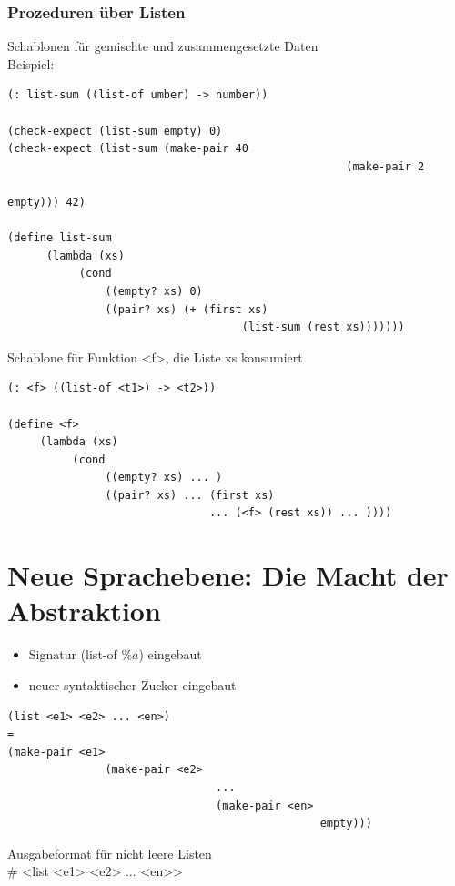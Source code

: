 \documentclass[paper=a4, fontsize=11pt]{scrartcl}
\numberwithin{equation}{section}
\numberwithin{figure}{section}
\numberwithin{table}{section}
\begin{document}
\begin{lstlistig}
\subsubsection{Prozeduren über Listen}
Schablonen für gemischte und zusammengesetzte Daten \\
Beispiel:
\begin{lstlisting}
(: list-sum ((list-of umber) -> number))

(check-expect (list-sum empty) 0)
(check-expect (list-sum (make-pair 40
                                                    (make-pair 2
                                                                    empty))) 42)
                                                                    
(define list-sum
      (lambda (xs)
           (cond
               ((empty? xs) 0)
               ((pair? xs) (+ (first xs)
                                    (list-sum (rest xs)))))))                                                                    
\end{lstlisting}

Schablone für Funktion <f>, die Liste xs konsumiert
\begin{lstlisting}
(: <f> ((list-of <t1>) -> <t2>))

(define <f>
     (lambda (xs)
          (cond
               ((empty? xs) ... )
               ((pair? xs) ... (first xs)
                               ... (<f> (rest xs)) ... ))))
\end{lstlisting}
\section{Neue Sprachebene: Die Macht der Abstraktion}
\begin{itemize}
\item Signatur (list-of $\%a$) eingebaut
\item neuer syntaktischer Zucker eingebaut
\end{itemize}

\begin{lstlisting}
(list <e1> <e2> ... <en>)
=
(make-pair <e1>
               (make-pair <e2>
                                ...
                                (make-pair <en>
                                                empty)))
\end{lstlisting}
Ausgabeformat für nicht leere Listen \\
\# <list <e1> <e2> ... <en>> \\


\end{lstlistig}
\end{document}
